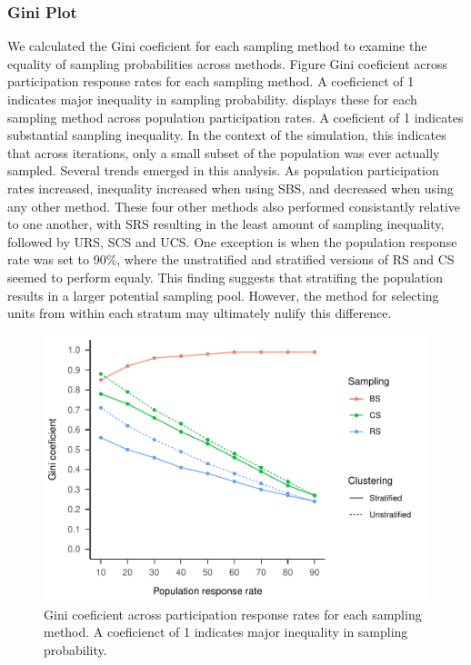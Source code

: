 \documentclass[man,floatsintext]{apa6}
\begin{document}
\hypertarget{gini-plot}{%
\subsubsection{Gini Plot}\label{gini-plot}}

We calculated the Gini coeficient for each sampling method to examine the equality of sampling probabilities across methods. Figure Gini coeficient across participation response rates for each sampling method. A coeficienct of 1 indicates major inequality in sampling probability. displays these for each sampling method across population participation rates. A coeficient of 1 indicates substantial sampling inequality. In the context of the simulation, this indicates that across iterations, only a small subset of the population was ever actually sampled. Several trends emerged in this analysis. As population participation rates increased, inequality increased when using SBS, and decreased when using any other method. These four other methods also performed consistantly relative to one another, with SRS resulting in the least amount of sampling inequality, followed by URS, SCS and UCS. One exception is when the population response rate was set to 90\%, where the unstratified and stratified versions of RS and CS seemed to perform equaly. This finding suggests that stratifing the population results in a larger potential sampling pool. However, the method for selecting units from within each stratum may ultimately nulify this difference.



\begin{figure}
\centering
\includegraphics{GenSamp-Paper_files/figure-latex/fig-gini-1.pdf}
\caption{\label{fig:fig-gini}Gini coeficient across participation response rates for each sampling method. A coeficienct of 1 indicates major inequality in sampling probability.}
\end{figure}
\end{document}
